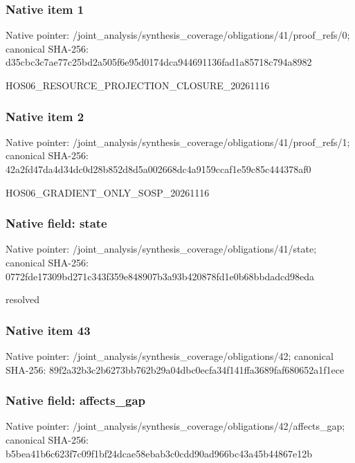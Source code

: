 \documentclass[10pt,a4paper]{article}
\begin{document}
\subsubsection{Native item 1}
Native pointer: /joint\_\allowbreak{}analysis/synthesis\_\allowbreak{}coverage/obligations/41/proof\_\allowbreak{}refs/0; canonical SHA-256: d35cbc3c7ae77c25bd2a505f6e95d0174dca944691136fad1a85718c794a8982

\begingroup\raggedright\sloppy HOS06\_\allowbreak{}RESOURCE\_\allowbreak{}PROJECTION\_\allowbreak{}CLOSURE\_\allowbreak{}20261116\par\endgroup

\subsubsection{Native item 2}
Native pointer: /joint\_\allowbreak{}analysis/synthesis\_\allowbreak{}coverage/obligations/41/proof\_\allowbreak{}refs/1; canonical SHA-256: 42a2fd47da4d34dc0d28b852d8d5a002668dc4a9159ccaf1e59c85c444378af0

\begingroup\raggedright\sloppy HOS06\_\allowbreak{}GRADIENT\_\allowbreak{}ONLY\_\allowbreak{}SOSP\_\allowbreak{}20261116\par\endgroup

\subsubsection{Native field: state}
Native pointer: /joint\_\allowbreak{}analysis/synthesis\_\allowbreak{}coverage/obligations/41/state; canonical SHA-256: 0772fde17309bd271c343f359e848907b3a93b420878fd1e0b68bbdadcd98eda

\begingroup\raggedright\sloppy resolved\par\endgroup

\subsubsection{Native item 43}
Native pointer: /joint\_\allowbreak{}analysis/synthesis\_\allowbreak{}coverage/obligations/42; canonical SHA-256: 89f2a32b3c2b6273bb762b29a04dbc0ecfa34f141ffa3689faf680652a1f1ece

\subsubsection{Native field: affects\_\allowbreak{}gap}
Native pointer: /joint\_\allowbreak{}analysis/synthesis\_\allowbreak{}coverage/obligations/42/affects\_\allowbreak{}gap; canonical SHA-256: b5bea41b6c623f7c09f1bf24dcae58ebab3c0cdd90ad966bc43a45b44867e12b
\end{document}
